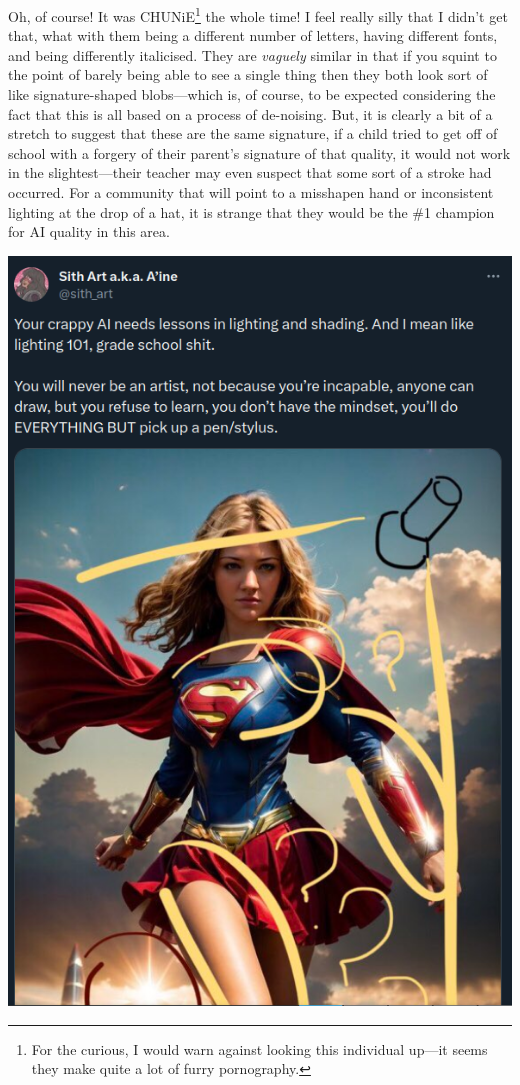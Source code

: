 \documentclass[11pt]{article}
\begin{document}
Oh, of course! It was CHUNiE\footnote{For the curious, I would warn against looking this individual up---it seems they make quite a lot of furry pornography.} the whole time! I feel really silly that I didn't get that, what with them being a different number of letters, having different fonts, and being differently italicised. They are \emph{vaguely} similar in that if you squint to the point of barely being able to see a single thing then they both look sort of like signature-shaped blobs---which is, of course, to be expected considering the fact that this is all based on a process of de-noising. But, it is clearly a bit of a stretch to suggest that these are the same signature, if a child tried to get off of school with a forgery of their parent's signature of that quality, it would not work in the slightest---their teacher may even suspect that some sort of a stroke had occurred. For a community that will point to a misshapen hand or inconsistent lighting at the drop of a hat, it is strange that they would be the \#1 champion for AI quality in this area.

\begin{center}
\includegraphics[width=.9\linewidth]{./images/bullying-Shadiversity-lighting.png}
\end{center}
\end{document}
